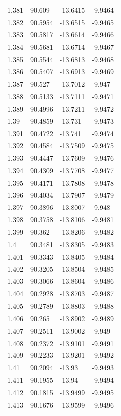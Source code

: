 \begin{tabular}{llll}
1.381 & 90.609 & -13.6415 & -9.9464 \\
1.382 & 90.5954 & -13.6515 & -9.9465 \\
1.383 & 90.5817 & -13.6614 & -9.9466 \\
1.384 & 90.5681 & -13.6714 & -9.9467 \\
1.385 & 90.5544 & -13.6813 & -9.9468 \\
1.386 & 90.5407 & -13.6913 & -9.9469 \\
1.387 & 90.527 & -13.7012 & -9.947 \\
1.388 & 90.5133 & -13.7111 & -9.9471 \\
1.389 & 90.4996 & -13.7211 & -9.9472 \\
1.39 & 90.4859 & -13.731 & -9.9473 \\
1.391 & 90.4722 & -13.741 & -9.9474 \\
1.392 & 90.4584 & -13.7509 & -9.9475 \\
1.393 & 90.4447 & -13.7609 & -9.9476 \\
1.394 & 90.4309 & -13.7708 & -9.9477 \\
1.395 & 90.4171 & -13.7808 & -9.9478 \\
1.396 & 90.4034 & -13.7907 & -9.9479 \\
1.397 & 90.3896 & -13.8007 & -9.948 \\
1.398 & 90.3758 & -13.8106 & -9.9481 \\
1.399 & 90.362 & -13.8206 & -9.9482 \\
1.4 & 90.3481 & -13.8305 & -9.9483 \\
1.401 & 90.3343 & -13.8405 & -9.9484 \\
1.402 & 90.3205 & -13.8504 & -9.9485 \\
1.403 & 90.3066 & -13.8604 & -9.9486 \\
1.404 & 90.2928 & -13.8703 & -9.9487 \\
1.405 & 90.2789 & -13.8803 & -9.9488 \\
1.406 & 90.265 & -13.8902 & -9.9489 \\
1.407 & 90.2511 & -13.9002 & -9.949 \\
1.408 & 90.2372 & -13.9101 & -9.9491 \\
1.409 & 90.2233 & -13.9201 & -9.9492 \\
1.41 & 90.2094 & -13.93 & -9.9493 \\
1.411 & 90.1955 & -13.94 & -9.9494 \\
1.412 & 90.1815 & -13.9499 & -9.9495 \\
1.413 & 90.1676 & -13.9599 & -9.9496 \\

\end{tabular}
